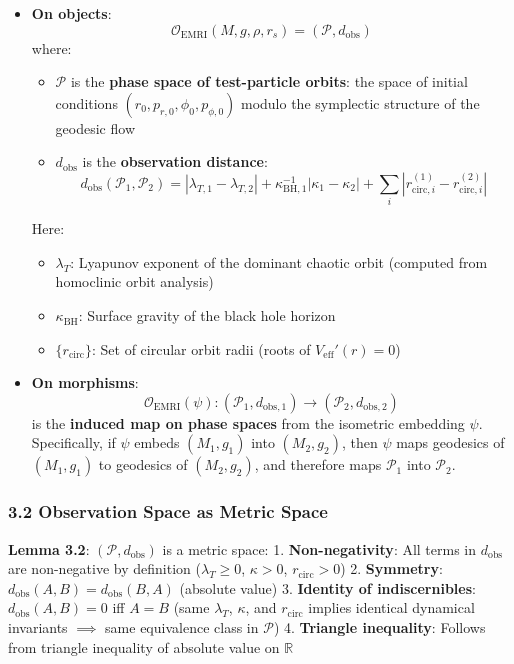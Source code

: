 \documentclass[
]{article}
\providecommand{\tightlist}{%
  \setlength{\itemsep}{0pt}\setlength{\parskip}{0pt}}
\begin{document}
\begin{itemize}
\tightlist
\item
  \textbf{On objects}:
  \[\mathcal{O}_{\text{EMRI}}(M, g, \rho, r_s) = (\mathcal{P}, d_{\text{obs}})\]
  where:

  \begin{itemize}
  \tightlist
  \item
    \(\mathcal{P}\) is the \textbf{phase space of test-particle orbits}:
    the space of initial conditions
    \((r_0, p_{r,0}, \phi_0, p_{\phi,0})\) modulo the symplectic
    structure of the geodesic flow
  \item
    \(d_{\text{obs}}\) is the \textbf{observation distance}:
    \[d_{\text{obs}}(\mathcal{P}_1, \mathcal{P}_2) = |\lambda_{T,1} - \lambda_{T,2}| + \kappa_{\text{BH},1}^{-1}|\kappa_1 - \kappa_2| + \sum_i |r_{\text{circ},i}^{(1)} - r_{\text{circ},i}^{(2)}|\]
  \end{itemize}

  Here:

  \begin{itemize}
  \tightlist
  \item
    \(\lambda_T\): Lyapunov exponent of the dominant chaotic orbit
    (computed from homoclinic orbit analysis)
  \item
    \(\kappa_{\text{BH}}\): Surface gravity of the black hole horizon
  \item
    \(\{r_{\text{circ}}\}\): Set of circular orbit radii (roots of
    \(V_{\text{eff}}'(r) = 0\))
  \end{itemize}
\item
  \textbf{On morphisms}:
  \[\mathcal{O}_{\text{EMRI}}(\psi): (\mathcal{P}_1, d_{\text{obs},1}) \to (\mathcal{P}_2, d_{\text{obs},2})\]
  is the \textbf{induced map on phase spaces} from the isometric
  embedding \(\psi\). Specifically, if \(\psi\) embeds \((M_1, g_1)\)
  into \((M_2, g_2)\), then \(\psi\) maps geodesics of \((M_1, g_1)\) to
  geodesics of \((M_2, g_2)\), and therefore maps \(\mathcal{P}_1\) into
  \(\mathcal{P}_2\).
\end{itemize}

\subsubsection{3.2 Observation Space as Metric
Space}\label{observation-space-as-metric-space}

\textbf{Lemma 3.2}: \((\mathcal{P}, d_{\text{obs}})\) is a metric space:
1. \textbf{Non-negativity}: All terms in \(d_{\text{obs}}\) are
non-negative by definition (\(\lambda_T \geq 0\), \(\kappa > 0\),
\(r_{\text{circ}} > 0\)) 2. \textbf{Symmetry}:
\(d_{\text{obs}}(A, B) = d_{\text{obs}}(B, A)\) (absolute value) 3.
\textbf{Identity of indiscernibles}: \(d_{\text{obs}}(A, B) = 0\) iff
\(A = B\) (same \(\lambda_T\), \(\kappa\), and \(r_{\text{circ}}\)
implies identical dynamical invariants \(\implies\) same equivalence
class in \(\mathcal{P}\)) 4. \textbf{Triangle inequality}: Follows from
triangle inequality of absolute value on \(\mathbb{R}\)
\end{document}
